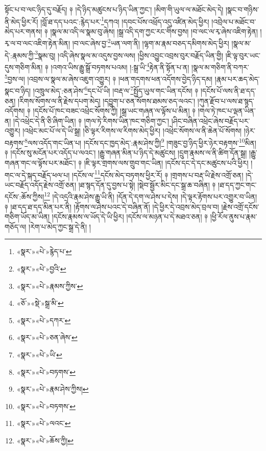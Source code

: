 སྟོང་པ་བ་ལང་ཉིད་དུ་བརྗོད། ༈ །དེ་ཉིད་མཚུངས་པ་ཉིད་ཡིན་ཀྱང་། །མིག་གི་ཡུལ་ལ་མཐོང་མེད་དེ། །སྣང་བ་གཉིས་ནི་མེད་ཕྱིར་རོ། །བློ་ཐ་དད་པའང་:རྙེད་པར་\footnote{«སྣར་»«པེ་»རྙེད་པ་}དཀའ། །དབང་པོས་འཕྲོད་འདུ་འཛིན་མེད་ཕྱིར། །འབྲེལ་པ་མཐོང་བ་མེད་པར་གནས། ༈ །སྣལ་མ་འདི་ལ་སྣམ་བུ་ཞེས། །སྒྲ་འདི་དག་ཀྱང་རང་གིས་བྱས། །བ་ལང་ལ་རྭ་ཞེས་འཇིག་རྟེན། །རྭ་ལ་བ་ལང་འཇིག་རྟེན་མིན། །བ་ལང་ཞེས་བྱ་\footnote{«སྣར་»«པེ་»བྱའི་}ཡན་ལག་ནི། །ལྷག་མ་རྣམ་བཅད་དམིགས་མེད་ཕྱིར། །སྣལ་མ་དེ་:རྣམས་ཀྱི་\footnote{«སྣར་»«པེ་»རྣམས་ཀྱིས་}སྣམ་བུ། །འདི་ཞེས་སྣལ་མ་འདུས་བྱས་ལས། །ཕྱིས་འབྱུང་འབྲས་བུར་བརྗོད་ཡིན་གྱི། །ཇི་ལྟ་བུར་ཡང་དུས་གཅིག་མིན། ༈ །འགའ་ཡིས་རྒྱུ་སྒྲོ་བཏགས་པའམ། །:སྒྲ་ཡི་\footnote{«ཅོ་»«སྡེ་»སྒྲ་མི་}རྟེན་ནི་སྟོན་པ་ན། །སྣལ་མ་གཅིག་ནི་བཀར་\footnote{«སྣར་»«པེ་»དཀར་}བྱས་ལ། །འབྲས་ལ་སྣལ་མ་ཞེས་འཇུག་འགྱུར། ༈ །ཕན་གདགས་ཕན་འདོགས་བྱེད་ཉིད་དམ། །རྣམ་པར་ཆད་མེད་སྣང་བ་ཉིད། །འཁྲུལ་མེད་:ཅན་ཤེས་\footnote{«སྣར་»«པེ་»ཅན་ཞེས་}དང་པོ་ཡི། །བརྡ་ལ་\footnote{«སྣར་»«པེ་»ཡི་}སྤྱོད་ཡུལ་གང་ཡིན་དངོས། ༈ །དངོས་པོ་ལས་ནི་ཐ་དད་ཅན། །རིགས་སོགས་ལ་ནི་རྗེས་དཔག་མེད། །དབྱུག་པ་ཅན་སོགས་ཐམས་ཅད་ལའང་། །ཀུན་རྫོབ་པ་ལས་ཐ་སྙད་འདོགས། ༈ །དངོས་པོ་ཁང་བཟང་འཕྲེང་སོགས་ཀྱི། །སྒྲ་ཡང་གཞན་ལ་ལྟོས་པ་མིན། ༈ །གལ་ཏེ་ཁང་པ་ལྡན་ཡིན་ན། །དེ་འཕྲེང་དེ་ནི་ཅི་ཞིག་ཡིན། ༈ །གལ་ཏེ་རིགས་ཡིན་ཁང་གཅིག་ཀྱང་། །ཤིང་བཞིན་འཕྲེང་ཞེས་བརྗོད་པར་འགྱུར། །འཕྲེང་མང་པོ་ལ་དེ་ཡི་སྒྲ། །ཅི་ལྟར་རིགས་ལ་རིགས་མེད་ཕྱིར། །འཕྲེང་སོགས་ལ་ནི་ཆེན་པོ་སོགས། །ཉེར་བརྟགས་\footnote{«སྣར་»«པེ་»བཏགས་}ལས་འདོད་གང་ཡིན་པ། །དངོས་དང་ཁྱད་མེད་:རྣམ་ཤེས་ཀྱི།\footnote{«སྣར་»«པེ་»རྣམ་ཤེས་ཀྱིས།} །གཟུང་བྱ་ཉིད་ཕྱིར་ཉེར་བརྟགས་\footnote{«སྣར་»«པེ་»བཏགས་}མིན། ༈ །དངོས་སུ་མངོན་པར་འདོད་པ་ལའང་། །རྒྱུ་གཞན་མིན་པ་ཉིད་དེ་མཚུངས། །དྲུག་རྣམས་ལ་ནི་ཚིག་དོན་སྒྲ། །རྒྱུ་གཞན་གང་ལ་ལྟོས་པར་མཐོང་། ༈ །ཇི་ལྟར་གྲགས་ལས་གྲུབ་གང་ཡིན། །དངོས་དང་དེ་དང་མཚུངས་པའི་ཕྱིར། །གང་ལ་དེ་སྐད་བརྗོད་ཕལ་པ། །དངོས་ལ་\footnote{«སྣར་»«པེ་»ལའང་}དངོས་མེད་བཏགས་ཕྱིར་རོ། ༈ །གྲགས་པ་བརྡ་ཡི་རྗེས་འགྲོ་ཅན། །དེ་ཡང་བརྗོད་འདོད་རྗེས་འགྲོ་ཅན། །ཐ་སྙད་དོན་དུ་བྱས་པ་སྟེ། །སྡེབ་སྦྱོར་མིང་དང་སྒྲ་ཆ་བཞིན། ༈ །ཐ་དད་ཀྱང་གང་དངོས་:ཆོས་ཀྱིས།\footnote{«སྣར་»«པེ་»ཆོས་ཀྱི།} །དེ་འདྲའི་རྣམ་ཤེས་རྒྱུ་ཡི་ནི། །དོན་དེ་དག་ལ་ཤེས་པ་དེས། །དེ་ལྟར་རྟོགས་པར་འགྱུར་བ་ཡིན། ༈ །ཐ་དད་ཐ་དད་མིན་པར་ནི། །རྟོགས་ལ་ཤེས་པའང་དེ་བཞིན་ནོ། །དེ་ཕྱིར་དེ་འབྲས་མེད་བྲལ་བ། །རྗེས་འགྲོ་དངོས་གཅིག་ཡོད་མ་ཡིན། །དངོས་རྣམས་ལ་ཡོད་དེ་ཡི་ཕྱིར། །དངོས་ལ་མཉན་པ་དེ་མཐའ་ཅན། ༈ །ཕྱི་རོལ་ནུས་པ་རྣམ་གཅོད་ལ། །རེག་པ་མེད་ཀྱང་སྒྲ་དེ་ནི། །
